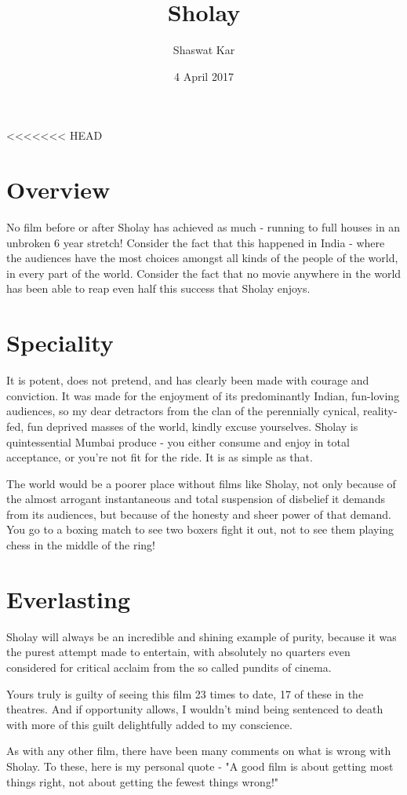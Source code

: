 \documentclass[a4paper,12pt]{article}
\title{Sholay}
\author{Shaswat Kar }
\date{4 April 2017}
\begin{document}
<<<<<<< HEAD

\section{Overview}

No film before or after Sholay has achieved as much - running to full houses in an unbroken 6 year stretch! Consider the fact that this happened in India - where the audiences have the most choices amongst all kinds of the people of the world, in every part of the world. Consider the fact that no movie anywhere in the world has been able to reap even half this success that Sholay enjoys.

\section{Speciality}

It is potent, does not pretend, and has clearly been made with courage and conviction. It was made for the enjoyment of its predominantly Indian, fun-loving audiences, so my dear detractors from the clan of the perennially cynical, reality-fed, fun deprived masses of the world, kindly excuse yourselves. Sholay is quintessential Mumbai produce - you either consume and enjoy in total acceptance, or you're not fit for the ride. It is as simple as that.

The world would be a poorer place without films like Sholay, not only because of the almost arrogant instantaneous and total suspension of disbelief it demands from its audiences, but because of the honesty and sheer power of that demand. You go to a boxing match to see two boxers fight it out, not to see them playing chess in the middle of the ring!

\section{Everlasting}

Sholay will always be an incredible and shining example of purity, because it was the purest attempt made to entertain, with absolutely no quarters even considered for critical acclaim from the so called pundits of cinema.

Yours truly is guilty of seeing this film 23 times to date, 17 of these in the theatres. And if opportunity allows, I wouldn't mind being sentenced to death with more of this guilt delightfully added to my conscience.

As with any other film, there have been many comments on what is wrong with Sholay. To these, here is my personal quote - "A good film is about getting most things right, not about getting the fewest things wrong!"
\end{document}
